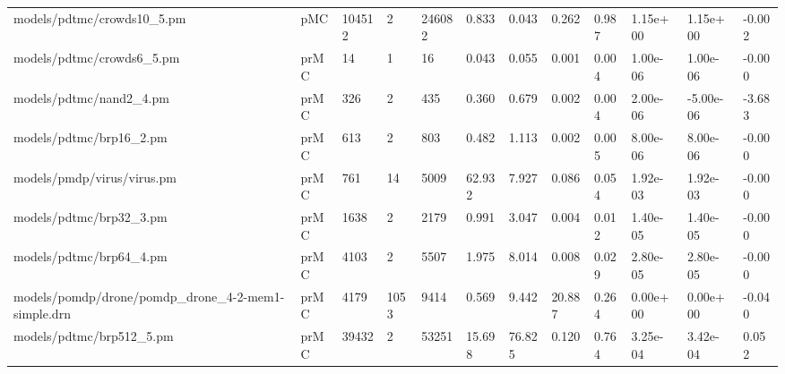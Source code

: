 \begin{tabular}{llllllllllll}
                        models/pdtmc/crowds10\_5.pm &  pMC & 104512 &          2 &      246082 &          0.833 &            0.043 &                        0.262 &          0.987 &         1.15e+00 &        1.15e+00 &       -0.002 \\
                         models/pdtmc/crowds6\_5.pm & prMC &     14 &          1 &          16 &          0.043 &            0.055 &                        0.001 &          0.004 &         1.00e-06 &        1.00e-06 &       -0.000 \\
                           models/pdtmc/nand2\_4.pm & prMC &    326 &          2 &         435 &          0.360 &            0.679 &                        0.002 &          0.004 &         2.00e-06 &       -5.00e-06 &       -3.683 \\
                           models/pdtmc/brp16\_2.pm & prMC &    613 &          2 &         803 &          0.482 &            1.113 &                        0.002 &          0.005 &         8.00e-06 &        8.00e-06 &       -0.000 \\
                        models/pmdp/virus/virus.pm & prMC &    761 &         14 &        5009 &         62.932 &            7.927 &                        0.086 &          0.054 &         1.92e-03 &        1.92e-03 &       -0.000 \\
                           models/pdtmc/brp32\_3.pm & prMC &   1638 &          2 &        2179 &          0.991 &            3.047 &                        0.004 &          0.012 &         1.40e-05 &        1.40e-05 &       -0.000 \\
                           models/pdtmc/brp64\_4.pm & prMC &   4103 &          2 &        5507 &          1.975 &            8.014 &                        0.008 &          0.029 &         2.80e-05 &        2.80e-05 &       -0.000 \\
models/pomdp/drone/pomdp\_drone\_4-2-mem1-simple.drn & prMC &   4179 &       1053 &        9414 &          0.569 &            9.442 &                       20.887 &          0.264 &         0.00e+00 &        0.00e+00 &       -0.040 \\
                          models/pdtmc/brp512\_5.pm & prMC &  39432 &          2 &       53251 &         15.698 &           76.825 &                        0.120 &          0.764 &         3.25e-04 &        3.42e-04 &        0.052 \\
\bottomrule
\end{tabular}
